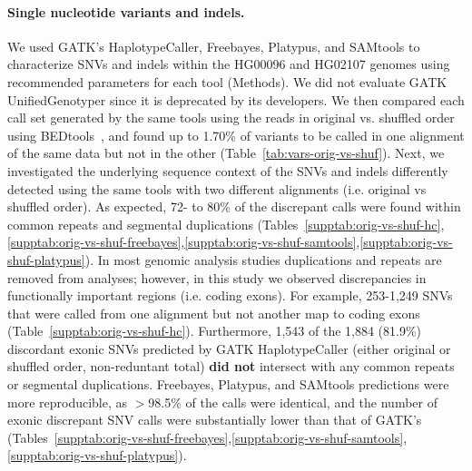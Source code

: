 \documentclass{bioinfo}
\begin{document}
\paragraph{Single nucleotide variants and indels.}
We used GATK's HaplotypeCaller, Freebayes, Platypus, and SAMtools to characterize
SNVs and indels within the HG00096 and HG02107 genomes using recommended parameters for each tool (Methods). 
We did not evaluate GATK UnifiedGenotyper since it is deprecated by its developers.
We then compared each call set generated by the same tools using the reads in original vs. shuffled order using BEDtools~\citep{Quinlan2010a}, and found up to 1.70\% of variants to be called in one alignment of the same data but not in the other (Table~\ref{tab:vars-orig-vs-shuf}).
Next, we investigated the underlying sequence context of the SNVs 
and indels differently detected using the same tools with two different alignments (i.e. original vs shuffled order). 
As expected, 72- to 80\% of the discrepant calls were found within common repeats and segmental duplications (Tables~\ref{supptab:orig-vs-shuf-hc},\ref{supptab:orig-vs-shuf-freebayes},\ref{supptab:orig-vs-shuf-samtools},\ref{supptab:orig-vs-shuf-platypus}). 
In most genomic analysis studies duplications and repeats are removed from analyses; however, in this study we observed discrepancies in functionally important regions (i.e. coding exons). For example, 253-1,249 SNVs that were called from one alignment but not another map to coding exons
(Table~\ref{supptab:orig-vs-shuf-hc}). 
Furthermore, 1,543 of the 1,884 (81.9\%) discordant exonic SNVs predicted by GATK HaplotypeCaller 
(either original or shuffled order, non-reduntant total) {\bf did not} intersect with any common repeats or segmental duplications.
Freebayes, Platypus, and SAMtools predictions were more reproducible, as $>$98.5\% of the calls were identical, and the number of exonic discrepant SNV calls were substantially lower than
that of GATK's (Tables~\ref{supptab:orig-vs-shuf-freebayes},\ref{supptab:orig-vs-shuf-samtools},\ref{supptab:orig-vs-shuf-platypus}). 
\end{document}

